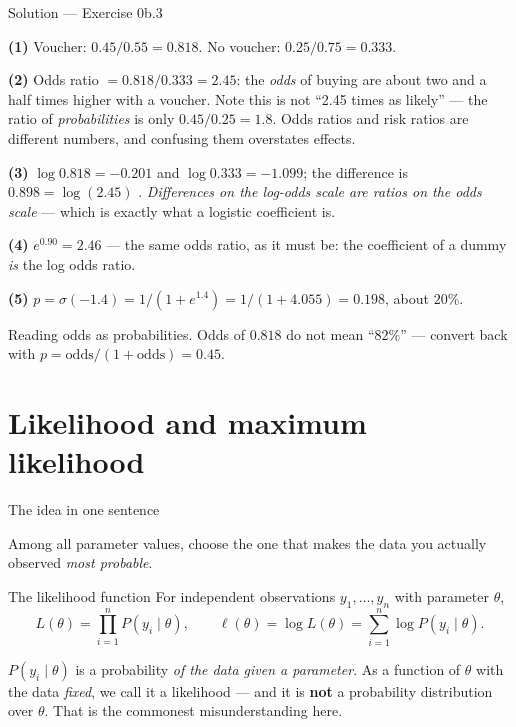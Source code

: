 \documentclass[aspectratio=169,11pt]{beamer}
\begin{document}
\begin{frame}{Solution --- Exercise 0b.3}
  \begin{solutionbox}
    \textbf{(1)} Voucher: $0.45/0.55 = \mathbf{0.818}$. No voucher:
    $0.25/0.75 = \mathbf{0.333}$.

    \textbf{(2)} Odds ratio $= 0.818/0.333 = \mathbf{2.45}$: the \emph{odds} of
    buying are about two and a half times higher with a voucher. Note this is
    not ``2.45 times as likely'' --- the ratio of \emph{probabilities} is only
    $0.45/0.25 = 1.8$. Odds ratios and risk ratios are different numbers, and
    confusing them overstates effects.

    \textbf{(3)} $\log 0.818 = -0.201$ and $\log 0.333 = -1.099$; the
    difference is $0.898 = \log(2.45)$ \checkmark. \emph{Differences on the
    log-odds scale are ratios on the odds scale} --- which is exactly what a
    logistic coefficient is.

    \textbf{(4)} $e^{0.90} = \mathbf{2.46}$ --- the same odds ratio, as it must
    be: the coefficient of a dummy \emph{is} the log odds ratio.

    \textbf{(5)} $p = \sigma(-1.4) = 1/(1 + e^{1.4}) = 1/(1+4.055) =
    \mathbf{0.198}$, about $20\%$.
  \end{solutionbox}
  \begin{mistake}
    Reading odds as probabilities. Odds of $0.818$
    do not mean ``$82\%$'' --- convert back with
    $p = \mathrm{odds}/(1+\mathrm{odds}) = 0.45$.
  \end{mistake}
\end{frame}


\section{Likelihood and maximum likelihood}

\begin{frame}{The idea in one sentence}
  \begin{takeaway}
    Among all parameter values, choose the one that makes the data you
    actually observed \emph{most probable}.
  \end{takeaway}
  \footnotesize
  \begin{block}{The likelihood function}
    For independent observations $y_1,\dots,y_n$ with parameter $\theta$,
    \[
      L(\theta) = \prod_{i=1}^{n} P(y_i \mid \theta),
      \qquad
      \ell(\theta) = \log L(\theta) = \sum_{i=1}^{n} \log P(y_i \mid \theta) .
    \]
  \end{block}
  \begin{readme}
    $P(y_i \mid \theta)$ is a probability \emph{of the data given a parameter}.
    As a function of $\theta$ with the data \emph{fixed}, we call it a
    likelihood --- and it is \textbf{not} a probability distribution over
    $\theta$. That is the commonest misunderstanding here.
  \end{readme}
\end{frame}
\end{document}
